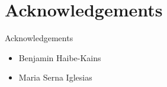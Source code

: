 
\section*{Acknowledgements}
\begin{frame}{Acknowledgements}
  \begin{itemize}
    \item Benjamin Haibe-Kains
    \item Maria Serna Iglesias
  \end{itemize}
\end{frame}